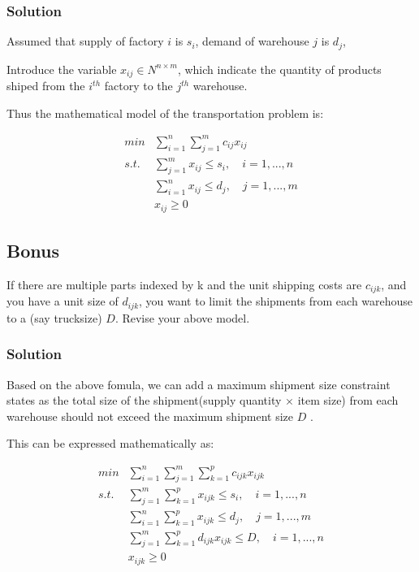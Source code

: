 \documentclass[11pt]{article}
\begin{document}
\hypertarget{solution}{%
\subsubsection{Solution}\label{solution}}

Assumed that supply of factory \(i\) is \(s_i\), demand of warehouse
\(j\) is \(d_j\),

Introduce the variable \(x_{ij} \in N^{n\times m}\), which indicate the
quantity of products shiped from the \(i^{th}\) factory to the
\(j^{th}\) warehouse.

Thus the mathematical model of the transportation problem is:

\[ \begin{align*} min &  \sum_{i=1}^n \sum_{j=1}^m c_{ij} x_{ij} 
\\  s.t. & \sum_{j=1}^m x_{ij}\leq s_i,  \quad i=1,...,n
\\ & \sum_{i=1}^n x_{ij}\leq d_j, \quad j=1,...,m
\\ & x_{ij}\geq 0 \end{align*}\]

    \hypertarget{bonus}{%
\subsection{Bonus}\label{bonus}}

If there are multiple parts indexed by k and the unit shipping costs are
\(c_{ijk}\), and you have a unit size of \(d_{ijk}\), you want to limit
the shipments from each warehouse to a (say trucksize) \(D\). Revise
your above model.

\hypertarget{solution}{%
\subsubsection{Solution}\label{solution}}

Based on the above fomula, we can add a maximum shipment size constraint
states as the total size of the shipment(supply quantity \(\times\) item
size) from each warehouse should not exceed the maximum shipment size
\(D\) .

This can be expressed mathematically as:

\[ 
\begin{align*} min & \sum_{i=1}^{n}\sum_{j=1}^{m}\sum_{k=1}^{p} c_{ijk}x_{ijk} \\
s.t. &\sum_{j=1}^{m}\sum_{k=1}^{p} x_{ijk} \leq s_i, \quad  i=1,...,n\\
&\sum_{i=1}^{n}\sum_{k=1}^{p} x_{ijk} \leq d_j, \quad j=1,...,m\\
&\sum_{j=1}^{m}\sum_{k=1}^{p} d_{ijk}x_{ijk} \leq D, \quad  i=1,...,n\\
&x_{ijk} \geq 0  \end{align*}\]
\end{document}
